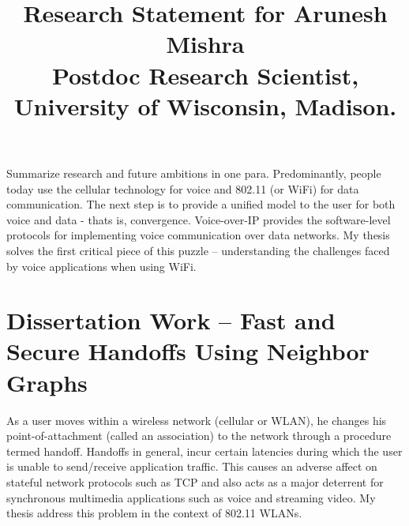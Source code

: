 \documentclass[11pt,letterpaper]{article}
\title{
\vspace{-2cm}Research Statement for Arunesh Mishra\\
{\large Postdoc Research Scientist, University of Wisconsin, Madison.}}
\begin{document}
\date{}
\maketitle
\vspace{-1cm}
Summarize research and future ambitions in one para.
 Predominantly,  people today use
the cellular technology for voice and 802.11 (or WiFi) for data communication. The next step is to provide a unified
model to the user for both voice and data - thats is, convergence. Voice-over-IP provides the software-level protocols
for implementing voice communication over data networks. My thesis solves the first critical piece of this puzzle --
understanding the challenges faced by voice applications when using WiFi.

\section{Dissertation Work -- Fast and Secure Handoffs Using Neighbor Graphs}
As a user moves within a wireless
network (cellular or WLAN), he changes his point-of-attachment (called an association) to the network through a
procedure termed handoff. Handoffs in general, incur certain latencies during which the user is unable to send/receive
application traffic. This causes an adverse affect on stateful network protocols such as TCP and also acts as a major
deterrent for synchronous multimedia applications such as voice and streaming video. My thesis address this problem in
the context of 802.11 WLANs.  

\end{document}
